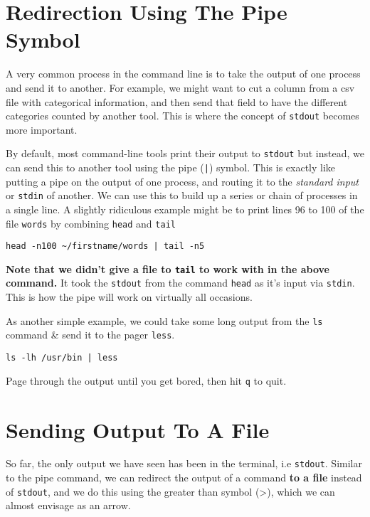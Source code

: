 \section{Redirection Using The Pipe Symbol}
\begin{information}
A very common process in the command line is to take the output of one process and send it to another.
For example, we might want to cut a column from a csv file with categorical information, and then send that field to have the different categories counted by another tool.
This is where the concept of \texttt{stdout} becomes more important. \\
\end{information}

\begin{steps}
By default, most command-line tools print their output to \texttt{stdout} but instead, we can send this to another tool using the pipe (\texttt{|}) symbol.
This is exactly like putting a pipe on the output of one process, and routing it to the \textit{standard input} or \texttt{stdin} of another.
We can use this to build up a series or chain of processes in a single line.
A slightly ridiculous example might be to print lines 96 to 100 of the file \texttt{words} by combining \texttt{head} and \texttt{tail}
\begin{lstlisting}
head -n100 ~/firstname/words | tail -n5
\end{lstlisting}
\end{steps}

\begin{information}
\textbf{Note that we didn't give a file to \texttt{tail} to work with in the above command.}
It took the \texttt{stdout} from the command \texttt{head} as it's input via \texttt{stdin}.
This is how the pipe will work on virtually all occasions.
\end{information}

\begin{steps}
As another simple example, we could take some long output from the \texttt{ls} command \& send it to the pager \texttt{less}.
\begin{lstlisting}
ls -lh /usr/bin | less
\end{lstlisting}
Page through the output until you get bored, then hit \texttt{q} to quit.
\end{steps}

\section{Sending Output To A File}
\begin{information}
So far, the only output we have seen has been in the terminal, i.e  \texttt{stdout}.
Similar to the pipe command, we can redirect the output of a command \textbf{to a file} instead of \texttt{stdout}, and we do this using the greater than symbol (\textgreater), which we can almost envisage as an arrow.\\

\end{information}

